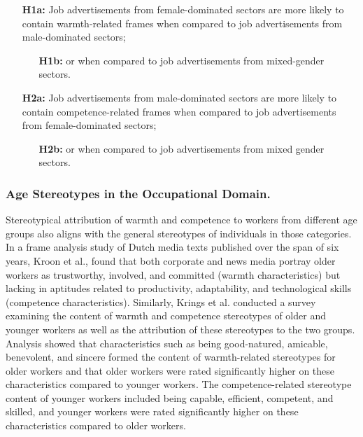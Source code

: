\documentclass[Royal,sageapa,times]{sagej}
\begin{document}
\begin{enumerate}
\item[\textbf{H1a:}] Job advertisements from female-dominated sectors are more likely to contain warmth-related frames when compared to job advertisements from male-dominated sectors;

\begin{enumerate}
\item[\textbf{H1b:}] or when compared to job advertisements from mixed-gender sectors.
\end{enumerate}

\item[\textbf{H2a:}] Job advertisements from male-dominated sectors are more likely to contain competence-related frames when compared to job advertisements from female-dominated sectors;

\begin{enumerate}
\item[\textbf{H2b:}] or when compared to job advertisements from mixed gender sectors.

\end{enumerate}
\end{enumerate}

\subsubsection{Age Stereotypes in the Occupational Domain.\label{age_stereotypes_in_the_occupational_domain}}

Stereotypical attribution of warmth and competence to workers from different age groups also aligns with the general stereotypes of individuals in those categories. In a frame analysis study of Dutch media texts published over the span of six years, Kroon et al., \citeyear{kroonReliableUnproductiveStereotypes2018} found that both corporate and news media portray older workers as trustworthy, involved, and committed (warmth characteristics) but lacking in aptitudes related to productivity, adaptability, and technological skills (competence characteristics). Similarly, Krings et al. \citeyear{kringsStereotypicalInferencesMediators2011} conducted a survey examining the content of warmth and competence stereotypes of older and younger workers as well as the attribution of these stereotypes to the two groups. Analysis showed that characteristics such as being good-natured, amicable, benevolent, and sincere formed the content of warmth-related stereotypes for older workers and that older workers were rated significantly higher on these characteristics compared to younger workers. The competence-related stereotype content of younger workers included being capable, efficient, competent, and skilled, and younger workers were rated significantly higher on these characteristics compared to older workers.
\end{document}
